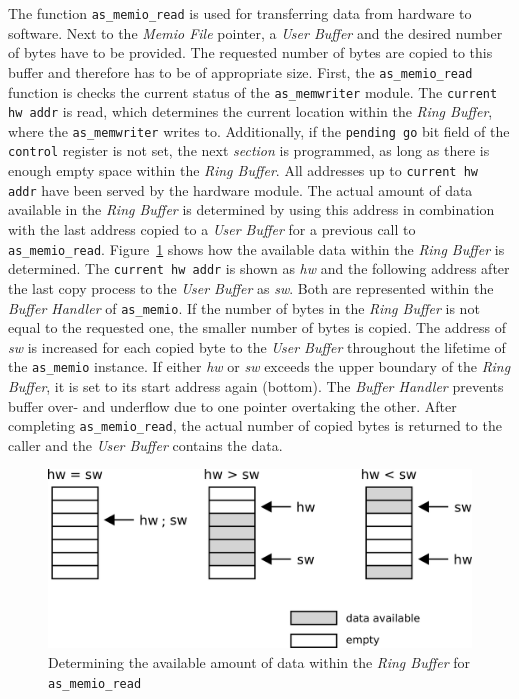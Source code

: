 The function \texttt{as\_memio\_read} is used for transferring data from hardware to software.
Next to the \textit{Memio File} pointer, a \textit{User Buffer} and the desired number of bytes have to be provided.
The requested number of bytes are copied to this buffer and therefore has to be of appropriate size.
First, the \texttt{as\_memio\_read} function is checks the current status of the \texttt{as\_memwriter} module.
The \texttt{current hw addr} is read, which determines the current location within the \textit{Ring Buffer}, where the \texttt{as\_memwriter} writes to.
Additionally, if the \texttt{pending go} bit field of the \texttt{control} register is not set, the next \textit{section} is programmed, as long as there is enough empty space within the \textit{Ring Buffer}.
All addresses up to \texttt{current hw addr} have been served by the hardware module.
The actual amount of data available in the \textit{Ring Buffer} is determined by using this address in combination with the last address copied to a \textit{User Buffer} for a previous call to \texttt{as\_memio\_read}.
Figure~\ref{fig:memio_buffer_read} shows how the available data within the \textit{Ring Buffer} is determined. 
The \texttt{current hw addr} is shown as \textit{hw} and the following address after the last copy process to the \textit{User Buffer} as \textit{sw}.
Both are represented within the \textit{Buffer Handler} of \texttt{as\_memio}.
If the number of bytes in the \textit{Ring Buffer} is not equal to the requested one, the smaller number of bytes is copied.
The address of \textit{sw} is increased for each copied byte to the \textit{User Buffer} throughout the lifetime of the \texttt{as\_memio} instance.
If either \textit{hw} or \textit{sw} exceeds the upper boundary of the \textit{Ring Buffer}, it is set to its start address again (bottom).
The \textit{Buffer Handler} prevents buffer over- and underflow due to one pointer overtaking the other.
After completing \texttt{as\_memio\_read}, the actual number of copied bytes is returned to the caller and the \textit{User Buffer} contains the data.

\begin{figure}[ht]
    \centering
    \includegraphics[width=0.6\linewidth,clip]{figs/memio_buffer_read.png}
    \caption{Determining the available amount of data within the \textit{Ring Buffer} for \texttt{as\_memio\_read}}
    \label{fig:memio_buffer_read}
\end{figure}

